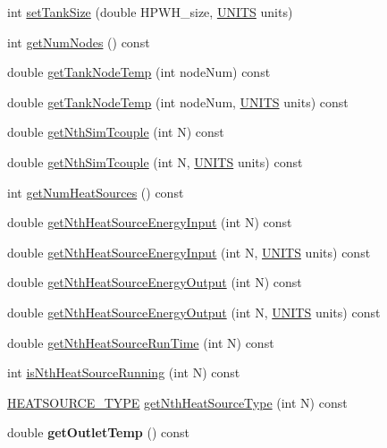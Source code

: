 \begin{DoxyCompactItemize}
\item 
int \hyperlink{class_h_p_w_h_a48eb98ee5cef78dc29fbeaba57c37b2d}{set\-Tank\-Size} (double H\-P\-W\-H\-\_\-size, \hyperlink{class_h_p_w_h_a145320dbf116b9245ac4421026cff294}{U\-N\-I\-T\-S} units)
\item 
int \hyperlink{class_h_p_w_h_a38e4f7eb3da82c2281657702fc472b1d}{get\-Num\-Nodes} () const 
\item 
double \hyperlink{class_h_p_w_h_a440f55f294a28f9024ce4731f515b802}{get\-Tank\-Node\-Temp} (int node\-Num) const 
\item 
double \hyperlink{class_h_p_w_h_afac039cdb5bb3643eb46fdef08a88948}{get\-Tank\-Node\-Temp} (int node\-Num, \hyperlink{class_h_p_w_h_a145320dbf116b9245ac4421026cff294}{U\-N\-I\-T\-S} units) const 
\item 
double \hyperlink{class_h_p_w_h_a3fc011d8bc8302e62d45e8fc92d1ce3e}{get\-Nth\-Sim\-Tcouple} (int N) const 
\item 
double \hyperlink{class_h_p_w_h_a87a26a59001216562f01eed1a0b877fe}{get\-Nth\-Sim\-Tcouple} (int N, \hyperlink{class_h_p_w_h_a145320dbf116b9245ac4421026cff294}{U\-N\-I\-T\-S} units) const 
\item 
int \hyperlink{class_h_p_w_h_a3d41868f9f79e940f59eec10432a1aec}{get\-Num\-Heat\-Sources} () const 
\item 
double \hyperlink{class_h_p_w_h_a2c2d3a5cf77dcb66137d9f89d63b46df}{get\-Nth\-Heat\-Source\-Energy\-Input} (int N) const 
\item 
double \hyperlink{class_h_p_w_h_a81113be21e2d6704d3a9178393a40cbe}{get\-Nth\-Heat\-Source\-Energy\-Input} (int N, \hyperlink{class_h_p_w_h_a145320dbf116b9245ac4421026cff294}{U\-N\-I\-T\-S} units) const 
\item 
double \hyperlink{class_h_p_w_h_ae321e3dc14aab36ae225d49496624153}{get\-Nth\-Heat\-Source\-Energy\-Output} (int N) const 
\item 
double \hyperlink{class_h_p_w_h_a2eb42a19d26901e89f33dea5c4b3d6c9}{get\-Nth\-Heat\-Source\-Energy\-Output} (int N, \hyperlink{class_h_p_w_h_a145320dbf116b9245ac4421026cff294}{U\-N\-I\-T\-S} units) const 
\item 
double \hyperlink{class_h_p_w_h_add3696333342add793a2aeb5f3433dbd}{get\-Nth\-Heat\-Source\-Run\-Time} (int N) const 
\item 
int \hyperlink{class_h_p_w_h_a587a39a680823886348b489e85f243e9}{is\-Nth\-Heat\-Source\-Running} (int N) const 
\item 
\hyperlink{class_h_p_w_h_af01f392e3fff4013310d3fe992bb00bc}{H\-E\-A\-T\-S\-O\-U\-R\-C\-E\-\_\-\-T\-Y\-P\-E} \hyperlink{class_h_p_w_h_a0b5bc1354d20431d5e1f15e2c56ddefa}{get\-Nth\-Heat\-Source\-Type} (int N) const 
\item 
\hypertarget{class_h_p_w_h_af16099ea18a8c1c9f6025b7e2fc00e7e}{double {\bfseries get\-Outlet\-Temp} () const }\label{class_h_p_w_h_af16099ea18a8c1c9f6025b7e2fc00e7e}


\end{DoxyCompactItemize}
